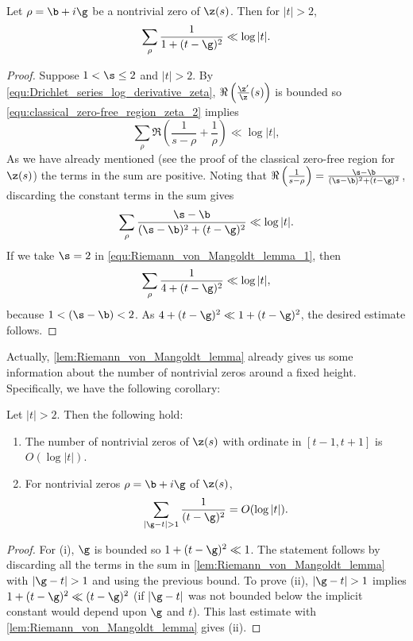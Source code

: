       \begin{lemma}\label{lem:Riemann_von_Mangoldt_lemma}
        Let $\rho = \b+i\g$ be a nontrivial zero of $\z(s)$. Then for $|t| > 2$,
        \[
          \sum_{\rho}\frac{1}{1+(t-\g)^{2}} \ll \log|t|.
        \]
      \end{lemma}
      \begin{proof}
        Suppose $1 < \s \le 2$ and $|t| > 2$. By \cref{equ:Drichlet_series_log_derivative_zeta}, $\Re\left(\frac{\z'}{\z}(s)\right)$ is bounded so \cref{equ:classical_zero-free_region_zeta_2} implies
        \[
          \sum_{\rho}\Re\left(\frac{1}{s-\rho}+\frac{1}{\rho}\right) \ll \log|t|,
        \]
        As we have already mentioned (see the proof of the classical zero-free region for $\z(s)$) the terms in the sum are positive. Noting that $\Re\left(\frac{1}{s-\rho}\right) = \frac{\s-\b}{(\s-\b)^{2}+(t-\g)^{2}}$, discarding the constant terms in the sum gives
        \begin{equation}\label{equ:Riemann_von_Mangoldt_lemma_1}
          \sum_{\rho}\frac{\s-\b}{(\s-\b)^{2}+(t-\g)^{2}} \ll \log|t|.
        \end{equation}
        If we take $\s = 2$ in \cref{equ:Riemann_von_Mangoldt_lemma_1}, then
        \[
          \sum_{\rho}\frac{1}{4+(t-\g)^{2}} \ll \log|t|,
        \]
        because $1 < (\s-\b) < 2$. As $4+(t-\g)^{2} \ll 1+(t-\g)^{2}$, the desired estimate follows.
      \end{proof}

      Actually, \cref{lem:Riemann_von_Mangoldt_lemma} already gives us some information about the number of nontrivial zeros around a fixed height. Specifically, we have the following corollary:

      \begin{corollary}\label{cor:Riemann_von_Mangoldt_corollary}
        Let $|t| > 2$. Then the following hold:
        \begin{enumerate}[label=(\roman*)]
          \item The number of nontrivial zeros of $\z(s)$ with ordinate in $[t-1,t+1]$ is $O(\log|t|)$.
          \item For nontrivial zeros $\rho = \b+i\g$ of $\z(s)$,
          \[
            \sum_{|\g-t| > 1}\frac{1}{(t-\g)^{2}} = O(\log|t|).
          \]
        \end{enumerate}
      \end{corollary}
      \begin{proof}
        For (i), $\g$ is bounded so $1+(t-\g)^{2} \ll 1$. The statement follows by discarding all the terms in the sum in \cref{lem:Riemann_von_Mangoldt_lemma} with $|\g-t| > 1$ and using the previous bound. To prove (ii), $|\g-t| > 1$ implies $1+(t-\g)^{2} \ll (t-\g)^{2}$ (if $|\g-t|$ was not bounded below the implicit constant would depend upon $\g$ and $t$). This last estimate with \cref{lem:Riemann_von_Mangoldt_lemma} gives (ii).
      \end{proof}

